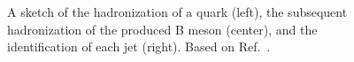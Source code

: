 \begin{figure}[htb]
    \centering
    \caption{
        A sketch of the hadronization of a \Pb quark (left), the subsequent hadronization of the produced B meson (center), and the identification of each jet (right). 
        Based on Ref.~\cite{BTaggingDiagramOrig}.
    }
    \label{fig:btagging}
\end{figure}

